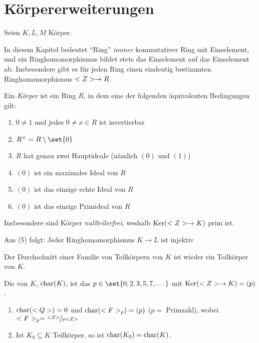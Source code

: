 \section{Körpererweiterungen}

Seien $K,L,M$ Körper.

\begin{remark}
	In diesem Kapitel bedeutet ``Ring'' \emph{immer} kommutativer Ring mit Einselement, und ein Ringhomomorphismus bildet stets das Einselement auf das Einselement ab.
	Insbesondere gibt es für jeden Ring einen eindeutig bestimmten Ringhomomorphismus $<Z> \to R$.
\end{remark}

\begin{remark}
	\begin{remarkenum}[]
		\item Ein \emph{Körper} ist ein Ring $R$, in dem eine der folgenden äquivalenten Bedingungen gilt:
		\begin{enumerate}[label=\arabic*)]
			\item $0 \neq 1$ und jedes $0 \neq x \in R$ ist invertierbar
			\item $R^{\times} = R \setminus \set{0}$
			\item $R$ hat genau zwei Hauptideale (nämlich $(0)$ und $(1)$)
			\item $(0)$ ist ein maximales Ideal von $R$
			\item $(0)$ ist das einzige echte Ideal von $R$
			\item $(0)$ ist das einzige Primideal von $R$
		\end{enumerate}
		\item Insbesondere sind Körper \emph{nullteilerfrei}, weshalb $\operatorname{Ker}(<Z> \to K)$ prim ist.
		\item Aus (5) folgt: Jeder Ringhomomorphismus $K \to L$ ist injektiv %
		\item {} Der Durchschnitt einer Familie von Teilkörpern von $K$ ist wieder ein Teilkörper von $K$.
	\end{remarkenum}
\end{remark}

\begin{definition}[Charakteristik]
	Die  von $K$, $\operatorname{char}(K)$, ist das $p \in \set{0,2,3,5,7, \dots}$ mit $\operatorname{Ker}(<Z> \to K) = (p)$.
\end{definition}

\begin{example}
	\begin{enumerate}[label=(\alph*)]
		\item $\operatorname{char}(<Q>) = 0$ und $\operatorname{char}(<F>_p) = (p)$ ($p =$ Primzahl), wobei $\Fp = \lnkset{\Z}{p\Z}$
		\item Ist $K_0 \subseteq K$ Teilkörper, so ist $\operatorname{char}(K_0) = \operatorname{char}(K)$.
	\end{enumerate}
\end{example}

